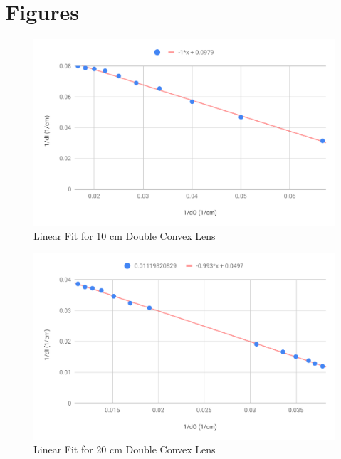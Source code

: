 \section{Figures}
\begin{figure}[ht]
    \centering
    \includegraphics[scale=0.74]{image/08-lenses/10cm.pdf}
    \caption{Linear Fit for 10 cm Double Convex Lens}
    \label{figure.08.10cm}
\end{figure}
\begin{figure}[ht]
    \centering
    \includegraphics[scale=0.74]{image/08-lenses/20cm.pdf}
    \caption{Linear Fit for 20 cm Double Convex Lens}
    \label{figure.08.20cm}
\end{figure}
